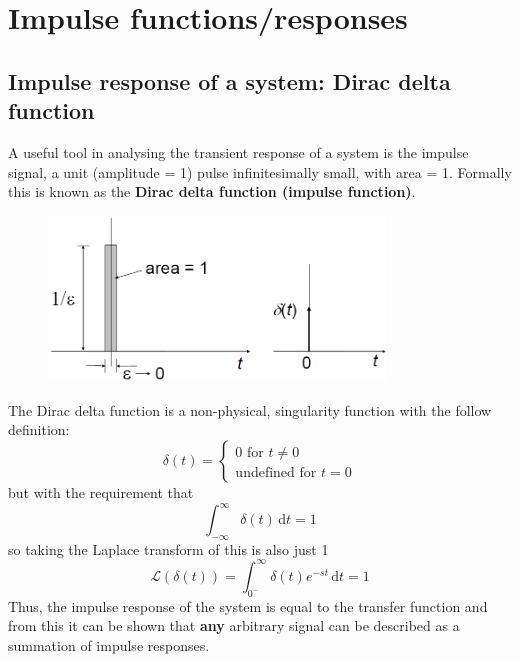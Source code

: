 \documentclass[class=report, crop=false, 12pt,a4paper, tikz, border=4mm]{standalone}
\begin{document}
\section{Impulse functions/responses}
\subsection{Impulse response of a system: Dirac delta function}
A useful tool in analysing the transient response of a system is the impulse signal, a unit (amplitude = 1) pulse infinitesimally small, with area = 1. Formally this is known as the \textbf{Dirac delta function (impulse function)}.
\begin{figure}[H]
  \centering
  \includegraphics[width = 0.8\textwidth]{../img/diagram23.png}
\end{figure}
The Dirac delta function is a non-physical, singularity function with the follow definition:
\begin{equation}
  \delta (t) = \begin{cases}
    0 \textrm{ for } t \neq 0\\
    \textrm{undefined for } t = 0 
  \end{cases}
\end{equation}
but with the requirement that
\begin{equation}
  \int_{-\infty}^{\infty} \delta (t) \,\mathrm{d}t =1
\end{equation}
so taking the Laplace transform of this is also just 1
\begin{equation}
  \mathcal{L} (\delta (t)) = \int_{0^-}^{\infty} \delta (t) e^{-st} \,\mathrm{d}t = 1 
\end{equation}
Thus, the impulse response of the system is equal to the transfer function and from this it can be shown that \textbf{any} arbitrary signal can be described as a summation of impulse responses.
\end{document}

